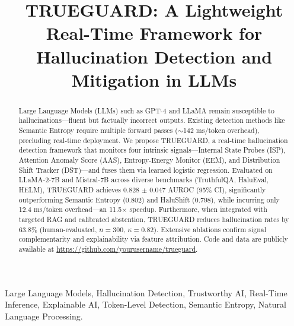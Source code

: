 \documentclass[conference]{IEEEtran}
\begin{document}
\title{TRUEGUARD: A Lightweight Real-Time Framework for Hallucination Detection and Mitigation in LLMs}

\author{
\and
{}
}

\maketitle

\begin{abstract}
Large Language Models (LLMs) such as GPT-4 and LLaMA remain susceptible to hallucinations---fluent but factually incorrect outputs. Existing detection methods like Semantic Entropy require multiple forward passes ($\sim$142 ms/token overhead), precluding real-time deployment. We propose TRUEGUARD, a real-time hallucination detection framework that monitors four intrinsic signals---Internal State Probes (ISP), Attention Anomaly Score (AAS), Entropy-Energy Monitor (EEM), and Distribution Shift Tracker (DST)---and fuses them via learned logistic regression. Evaluated on LLaMA-2-7B and Mistral-7B across diverse benchmarks (TruthfulQA, HaluEval, HELM), TRUEGUARD achieves 0.828 $\pm$ 0.047 AUROC (95\% CI), significantly outperforming Semantic Entropy (0.802) and HaluShift (0.798), while incurring only 12.4 ms/token overhead---an 11.5$\times$ speedup. Furthermore, when integrated with targeted RAG and calibrated abstention, TRUEGUARD reduces hallucination rates by 63.8\% (human-evaluated, $n=300$, $\kappa=0.82$). Extensive ablations confirm signal complementarity and explainability via feature attribution. Code and data are publicly available at \url{https://github.com/yourusername/trueguard}.
\end{abstract}

\begin{IEEEkeywords}
Large Language Models, Hallucination Detection, Trustworthy AI, Real-Time Inference, Explainable AI, Token-Level Detection, Semantic Entropy, Natural Language Processing.
\end{IEEEkeywords}
\end{document}
